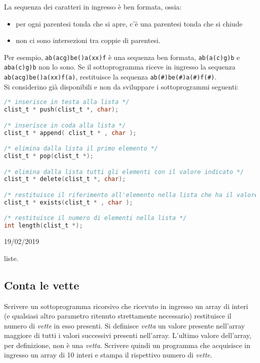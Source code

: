 La sequenza dei caratteri in ingresso \`e ben formata, ossia:
\begin{itemize}
    \item per ogni parentesi tonda che si apre, c'\`e una parentesi tonda che si chiude
    \item non ci sono intersezioni tra coppie di parentesi.
\end{itemize}
Per esempio, \texttt{ab(acg)be()a(xx)f} \`e una sequenza ben formata, \texttt{ab(a(c)g)b} e \texttt{aba(c)g)b} non lo sono.
Se il sottoprogramma riceve in ingresso la sequenza \texttt{ab(acg)be()a(xx)f(a)}, restituisce la sequenza \texttt{ab(\#)be(\#)a(\#)f(\#)}.
\\
Si considerino gi\`a disponibili e non da sviluppare i sottoprogrammi seguenti:
\\
\begin{lstlisting}[language=c]
/* inserisce in testa alla lista */
clist_t * push(clist_t *, char);

/* inserisce in coda alla lista */
clist_t * append( clist_t * , char );

/* elimina dalla lista il primo elemento */
clist_t * pop(clist_t *);

/* elimina dalla lista tutti gli elementi con il valore indicato */
clist_t * delete(clist_t *, char);

/* restituisce il riferimento all'elemento nella lista che ha il valore indicato, se esiste */
clist_t * exists(clist_t * , char );

/* restituisce il numero di elementi nella lista */
int length(clist_t *);
\end{lstlisting}

\begin{esame}
19/02/2019
\end{esame}

\begin{tags}
liste.
\end{tags}



\subsection{Conta le vette}
Scrivere un sottoprogramma ricorsivo che ricevuto in ingresso un array di interi (e qualsiasi altro parametro ritenuto strettamente necessario) restituisce il numero di \textit{vette} in esso presenti. Si definisce \textit{vetta} un valore presente nell'array maggiore di tutti i valori successivi presenti nell'array. L'ultimo valore dell'array, per definizione, non \`e una \textit{vetta}.
Scrivere quindi un programma che acquisisce in ingresso un array di 10 interi e stampa il rispettivo numero di \textit{vette}.

